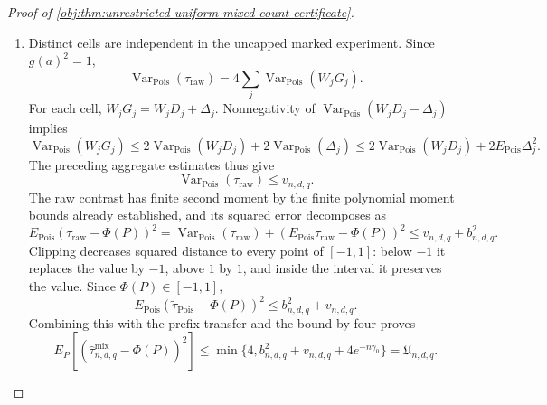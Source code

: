 \documentclass[11pt]{article}
\begin{document}
\begin{proof}[Proof of \cref{obj:thm:unrestricted-uniform-mixed-count-certificate}]
\begin{enumerate}
\item Distinct cells are independent in the uncapped marked experiment.
Since \(g(a)^2=1\),
\[
\operatorname{Var}_{\mathrm{Pois}}(\tau_{\mathrm{raw}})
=4\sum_j\operatorname{Var}_{\mathrm{Pois}}(W_jG_j).
\]
For each cell, \(W_jG_j=W_jD_j+\Delta_j\). Nonnegativity of
\(\operatorname{Var}_{\mathrm{Pois}}(W_jD_j-\Delta_j)\) implies
\[
\operatorname{Var}_{\mathrm{Pois}}(W_jG_j)
\le
2\operatorname{Var}_{\mathrm{Pois}}(W_jD_j)
+2\operatorname{Var}_{\mathrm{Pois}}(\Delta_j)
\le
2\operatorname{Var}_{\mathrm{Pois}}(W_jD_j)
+2E_{\mathrm{Pois}}\Delta_j^2.
\]
The preceding aggregate estimates thus give
\[
\operatorname{Var}_{\mathrm{Pois}}(\tau_{\mathrm{raw}})
\le v_{n,d,q}.
\]
The raw contrast has finite second moment by the finite polynomial moment
bounds already established, and its squared error decomposes as
\[
E_{\mathrm{Pois}}(\tau_{\mathrm{raw}}-\Phi(P))^2
=
\operatorname{Var}_{\mathrm{Pois}}(\tau_{\mathrm{raw}})
+(E_{\mathrm{Pois}}\tau_{\mathrm{raw}}-\Phi(P))^2
\le v_{n,d,q}+b_{n,d,q}^2.
\]
Clipping decreases squared distance to every point of \([-1,1]\): below
\(-1\) it replaces the value by \(-1\), above \(1\) by \(1\), and inside the
interval it preserves the value. Since \(\Phi(P)\in[-1,1]\),
\[
E_{\mathrm{Pois}}(\widetilde\tau_{\mathrm{Pois}}-\Phi(P))^2
\le b_{n,d,q}^2+v_{n,d,q}.
\]
Combining this with the prefix transfer and the bound by four proves
\[
E_P\!\left[
(\widehat\tau^{\mathrm{mix}}_{n,d,q}-\Phi(P))^2
\right]
\le
\min\{4,b_{n,d,q}^2+v_{n,d,q}+4e^{-n\gamma_0}\}
=\mathfrak U_{n,d,q}.
\]


\end{enumerate}
\end{proof}
\end{document}
